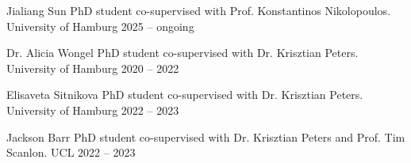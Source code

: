 



\begin{cvhonors}

  \cvhonor
    {Jialiang Sun} %
    {PhD student co-supervised with Prof. Konstantinos Nikolopoulos.} %
    {University of Hamburg} %
    {2025 -- ongoing} %

  \cvhonor
    {Dr. Alicia Wongel} %
    {PhD student co-supervised with Dr. Krisztian Peters.} %
    {University of Hamburg} %
    {2020 -- 2022} %

  \cvhonor
    {Elisaveta Sitnikova} %
    {PhD student co-supervised with Dr. Krisztian Peters.} %
    {University of Hamburg} %
    {2022 -- 2023} %

  \cvhonor
    {Jackson Barr} %
    {PhD student co-supervised with Dr. Krisztian Peters and Prof. Tim Scanlon.} %
    {UCL} %
    {2022 -- 2023} %

\end{cvhonors}



